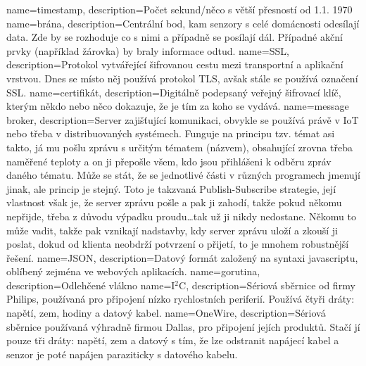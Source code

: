 {
  name={timestamp},
  description={Počet sekund/něco s větší přesností od 1.1. 1970}
}
{
  name={brána},
  description={Centrální bod, kam senzory s celé domácnosti odesílají data. Zde by se rozhoduje co s nimi a případně se 
  posílají dál. Případné akční prvky (například žárovka) by braly informace odtud.}
}
{
  name={SSL},
  description={Protokol vytvářející šifrovanou cestu mezi transportní a aplikační vrstvou. Dnes se místo něj používá 
protokol TLS, avšak stále se používá označení SSL.}
}
{
  name={certifikát},
  description={Digitálně podepsaný veřejný šifrovací klíč, kterým někdo nebo něco dokazuje, že je tím za koho se 
vydává.}
}
{
  name={message broker},
  description={Server zajišťující komunikaci, obvykle se používá právě v IoT nebo třeba v distribuovaných systémech. 
Funguje na principu tzv. témat asi takto, já mu pošlu zprávu s určitým tématem (názvem), obsahující zrovna třeba 
naměřené teploty a on ji přepošle všem, kdo jsou přihlášeni k odběru zpráv daného tématu. Může se stát, že se jednotlivé 
části v různých programech jmenují jinak, ale princip je stejný. Toto je takzvaná Publish-Subscribe strategie, její 
vlastnost však je, že server zprávu pošle a pak ji zahodí, takže pokud někomu nepřijde, třeba z důvodu výpadku 
proudu\ldots tak už ji nikdy nedostane. Někomu to může vadit, takže pak vznikají nadstavby, kdy server zprávu uloží 
a zkouší ji poslat, dokud od klienta neobdrží potvrzení o přijetí, to je mnohem robustnější řešení.}
}
{
  name={JSON},
  description={Datový formát založený na syntaxi javascriptu, oblíbený zejména ve webových aplikacích.}
}
{
  name={gorutina},
  description={Odlehčené vlákno}
}
{
  name={I$^2$C},
  description={Sériová sběrnice od firmy Philips, používaná pro připojení nízko rychlostních periferií. Používá čtyři 
dráty: napětí, zem, hodiny a datový kabel.}
}
{
  name={OneWire},
  description={Sériová sběrnice používaná výhradně firmou Dallas, pro připojení jejích produktů. Stačí jí pouze tři 
dráty: napětí, zem a datový s tím, že lze odstranit napájecí kabel a senzor je poté napájen paraziticky s datového 
kabelu.}
}

